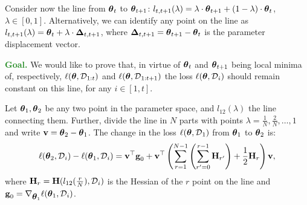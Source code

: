 \documentclass{article} %
\newcommand{\hessian}{\vH}
\begin{document}
Consider now the line from $\vparam_{t}$ to $\vparam_{t+1}$: $l_{t,t+1}(\lambda) = \lambda\cdot \vparam_{t+1} + (1-\lambda)\cdot \vparam_{t}$, $\lambda \in [0,1]$. Alternatively, we can identify any point on the line as $l_{t,t+1}(\lambda) = \vparam_t + \lambda\cdot \vDelta_{t,t+1}$, where $\vDelta_{t,t+1} = \vparam_{t+1} - \vparam_t$ is the parameter displacement vector.


\textcolor{forestgreen}{\textbf{Goal.}} We would like to prove that, in virtue of $\vparam_t$ and $\vparam_{t+1}$ being  local minima of, respectively, $\loss(\vparam, \data_{1:t})$ and $\loss(\vparam, \data_{1:t+1})$ the loss $\loss(\vparam, \data_{i})$ should remain constant on this line, for any $i \in [1,t]$. 


\begin{thm}
\label{theo:formula-loss-change}
    Let $\vparam_1,\vparam_2$ be any two point in the parameter space, and $l_{12}(\lambda)$ the line connecting them. Further, divide the line in $N$ parts with points $\lambda = \frac{1}{N}, \frac{2}{N}, \dots, 1$ and write $\vv = \vparam_2 - \vparam_1$. The change in the loss $\loss(\vparam, \data_1)$ from $\vparam_1$ to $\vparam_2$ is: 
    \begin{equation}
        \loss(\vparam_{2}, \data_{i}) - \loss(\vparam_1, \data_{i}) = \vv^\top\vg_0 + \vv^\top \rnd{ \sum_{r=1}^{N-1} \rnd{ \sum_{r'=0}^{r-1} \hessian_{r'}} + \frac{1}{2}\hessian_r} \vv,
    \end{equation}
    where $\hessian_r = \hessian(l_{12}(\frac{r}{N}), \data_i)$ is the Hessian of the $r$ point on the line and $\vg_0 = \grad_{\vparam_1}\loss(\vparam_1, \data_{i})$.
\end{thm}
\end{document}
